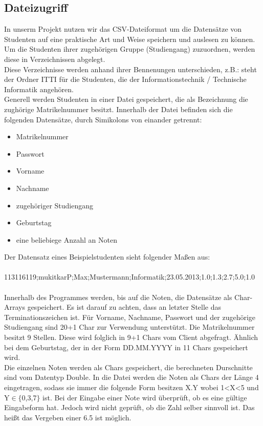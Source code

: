 \documentclass{scrartcl}
\begin{document}
	\subsection{Dateizugriff}
		In unserm Projekt nutzen wir das CSV-Dateiformat um die Datensätze von Studenten auf eine praktische Art und Weise speichern und auslesen zu können. Um die Studenten ihrer zugehörigen Gruppe (Studiengang) zuzuordnen, werden diese in Verzeichnissen abgelegt. \\
		Diese Verzeichnisse werden anhand ihrer Bennenungen unterschieden, z.B.: steht der Ordner ITTI für die Studenten, die der Informationstechnik / Technische Informatik angehören.\\
		Generell werden Studenten in einer Datei gespeichert, die als Bezeichnung die zughörige Matrikelnummer besitzt. Innerhalb der Datei befinden sich die folgenden Datensätze, durch Simikolons von einander getrennt:\\
		\begin{itemize}
			\item Matrikelnummer
			\item Passwort
			\item Vorname
			\item Nachname
			\item zugehöriger Studiengang
			\item Geburtstag
			\item eine beliebiege Anzahl an Noten
		\end{itemize}
		Der Datensatz eines Beispielstudenten sieht folgender Maßen aus:\\
		 \\
		113116119;mukitkarP;Max;Mustermann;Informatik;23.05.2013;1.0;1.3;2.7;5.0;1.0\\
		 \\
		Innerhalb des Programmes werden, bis auf die Noten, die Datensätze als Char-Arrays gespeichert. Es ist darauf zu achten, dass an letzter Stelle das Terminationszeichen ist. Für Vorname, Nachname, Passwort und der zugehörige Studiengang sind 20+1 Char zur Verwendung unterstützt. Die Matrikelnummer besitzt 9 Stellen. Diese wird folglich in 9+1 Chars vom Client abgefragt. Ähnlich bei dem Geburtstag, der in der Form DD.MM.YYYY in 11 Chars gespeichert wird. \\
		Die einzelnen Noten werden als Chars gespeichert, die berechneten Durschnitte sind vom Datentyp Double. In die Datei werden die Noten als Chars der Länge 4 eingetragen, sodass sie immer die folgende Form besitzen X.Y wobei 1<X<5 und Y$\in \{$0,3,7$\}$ ist. Bei der Eingabe einer Note wird überprüft, ob es eine gültige Eingabeform hat. Jedoch wird nicht geprüft, ob die Zahl selber sinnvoll ist. Das heißt das Vergeben einer 6.5 ist möglich.\\
		
\end{document}
